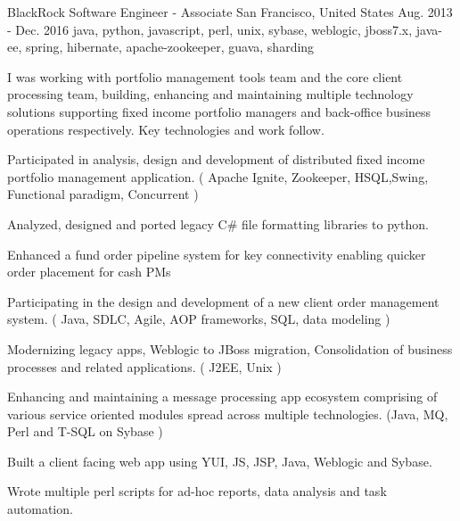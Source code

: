 \cventry
    {BlackRock} %
    {Software Engineer - Associate} %
    {San Francisco, United States} %
    {Aug. 2013 - Dec. 2016} %
    {java, python, javascript, perl, unix, sybase, weblogic, jboss7.x, java-ee, spring, hibernate, apache-zookeeper, guava, sharding}%
    {
        I was working with portfolio management tools team and the core client processing team, building, enhancing and maintaining multiple technology solutions
        supporting fixed income portfolio managers and back-office business operations respectively. Key technologies and work follow. \newline
    \begin{cvitems} %
        \item { Participated in analysis, design and development of distributed fixed income portfolio management application. ( Apache Ignite, Zookeeper, HSQL,Swing, Functional paradigm, Concurrent )}
        \item { Analyzed, designed and ported legacy C\# file formatting libraries to python.}
        \item { Enhanced a fund order pipeline system for key connectivity enabling quicker order placement for cash PMs}
        \item { Participating in the design and development of a new client order management system. ( Java, SDLC, Agile, AOP frameworks, SQL, data modeling )}
        \item { Modernizing legacy apps, Weblogic to JBoss migration, Consolidation of business processes and related applications. ( J2EE, Unix )}
        \item { Enhancing and maintaining a message processing app ecosystem comprising of various service oriented modules spread across multiple technologies. (Java, MQ, Perl and T-SQL on Sybase )}
        \item { Built a client facing web app using YUI, JS, JSP, Java, Weblogic and Sybase.}
        \item { Wrote multiple perl scripts for ad-hoc reports, data analysis and task automation.}
    \end{cvitems}
    }